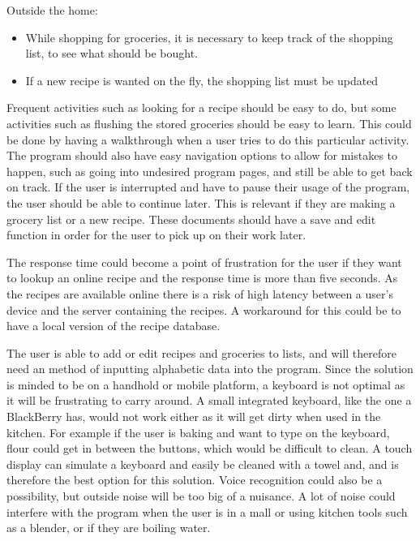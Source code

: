 Outside the home:
\begin{itemize}
\item While shopping for groceries, it is necessary to keep track of the shopping list, to see what should be bought.
\item If a new recipe is wanted on the fly, the shopping list must be updated
\end{itemize}

Frequent activities such as looking for a recipe should be easy to do, but some activities such as flushing the stored groceries should be easy to learn. This could be done by having a walkthrough when a user tries to do this particular activity. The program should also have easy navigation options to allow for mistakes to happen, such as going into undesired program pages, and still be able to get back on track. If the user is interrupted and have to pause their usage of the program, the user should be able to continue later. This is relevant if they are making a grocery list or a new recipe. These documents  should have a save and edit function in order for the user to pick up on their work later.

The response time could become a point of frustration for the user if they want to lookup an online recipe and the response time is more than five seconds. As the recipes are available online there is a risk of high latency between a user's device and the server containing the recipes. A workaround for this could be to have a local version of the recipe database. %

The user is able to add or edit recipes and groceries to lists, and will therefore need an method of inputting alphabetic data into the program. Since the solution is minded to be on a handhold or mobile platform, a keyboard is not optimal as it will be frustrating to carry around. A small integrated keyboard, like the one a BlackBerry has\cite{blakBerry}, would not work either as it will get dirty when used in the kitchen. For example if the user is baking and want to type on the keyboard, flour could get in between the buttons, which would be difficult to clean. A touch display can simulate a keyboard and easily be cleaned with a towel and, and is therefore the best option for this solution. Voice recognition could also be a possibility, but outside noise will be too big of a nuisance. A lot of noise could interfere with the program when the user is in a mall or using kitchen tools such as a blender, or if they are boiling water.